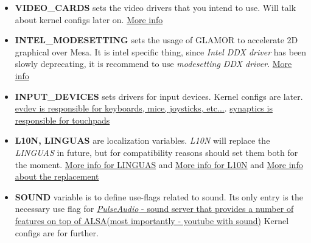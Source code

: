 \documentclass[10pt,a4paper]{article}
\begin{document}
\begin{itemize}

    
                    \item \textbf{VIDEO\_CARDS} sets the video drivers that you intend to use. Will talk about kernel configs later on. \href{https://wiki.gentoo.org/wiki/Xorg/Guide#make.conf}{More info}
                    

                    
                    \item \textbf{INTEL\_MODESETTING} sets the usage of GLAMOR to accelerate 2D graphical over Mesa. It is intel specific thing, since \textit{Intel DDX driver} has been slowly deprecating, it is recommend to use \textit{modesetting DDX driver}. \href{https://wiki.gentoo.org/wiki/Intel#Modesetting_DDX}{More info}
                    

                    
                    \item \textbf{INPUT\_DEVICES} sets drivers for input devices. Kernel configs are later. \href{https://wiki.gentoo.org/wiki/Evdev#Driver}{evdev is responsible for keyboards, mice, joysticks, etc...}. \href{https://wiki.gentoo.org/wiki/Synaptics#Driver}{synaptics is responsible for touchpads}
                    

                    
                    \item \textbf{L10N, LINGUAS} are localization variables. \textit{L10N} will replace the \textit{LINGUAS} in future, but for compatibility reasons should set them both for the moment. \href{https://wiki.gentoo.org/wiki/Localization/Guide#LINGUAS}{More info for LINGUAS} and \href{https://wiki.gentoo.org/wiki/Localization/Guide#L10N}{More info for L10N} and \href{https://www.gentoo.org/support/news-items/2016-06-23-l10n-use_expand.html}{More info about the replacement}
                    

                    
                    \item \textbf{SOUND} variable is to define use-flags related to sound. Its only entry is the necessary use flag for \href{https://wiki.gentoo.org/wiki/PulseAudio#Software}{\textit{PulseAudio} - sound server that provides a number of features on top of ALSA(most importantly - youtube with sound)} Kernel configs are for further. 
                    

\end{itemize}
\end{document}
